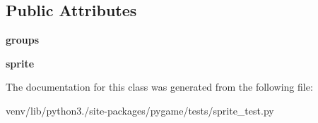 \subsection*{Public Attributes}
\begin{DoxyCompactItemize}
\item 
\mbox{\label{classpygame_1_1tests_1_1sprite__test_1_1_sprite_base_a98c9e6e1288addaa76fc45f409140ab1}} 
{\bfseries groups}
\item 
\mbox{\label{classpygame_1_1tests_1_1sprite__test_1_1_sprite_base_aa5d25e0dce470e5304f3ac951958f182}} 
{\bfseries sprite}
\end{DoxyCompactItemize}


The documentation for this class was generated from the following file\+:\begin{DoxyCompactItemize}
\item 
venv/lib/python3./site-\/packages/pygame/tests/sprite\+\_\+test.\+py\end{DoxyCompactItemize}
